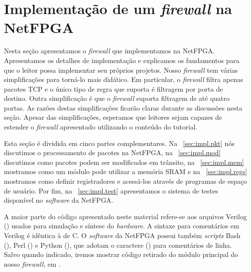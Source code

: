 \newpage
\section{Implementação de um \emph{firewall} na NetFPGA}
\label{sec:impl}

Nesta seção apresentamos o \emph{firewall} que implementamos na
NetFPGA.  Apresentamos os detalhes de implementação e explicamos os
fundamentos para que o leitor possa implementar seu próprios
projetos.  Nosso \emph{firewall} tem várias simplificações para
torná-lo mais didático.  Em particular, o \emph{firewall} filtra
apenas pacotes TCP e o único tipo de regra que suporta é filtragem
por porta de destino.  Outra simplificação é que o \emph{firewall}
suporta filtragem de até quatro portas.  As razões destas
simplificações ficarão claras durante as discussões nesta seção.
Apesar das simplificações, esperamos que leitores sejam capazes de
estender o \emph{firewall} apresentado utilizando o conteúdo do
tutorial.

Esta seção é dividida em cinco partes complementares.  Na
\secstr~\ref{sec:impl.pkt} nós discutimos o processamento de pacotes
na NetFPGA, na \secstr~\ref{sec:impl.mod} discutimos como pacotes
podem ser modificados em trânsito, na \secstr~\ref{sec:impl.mem}
mostramos como um módulo pode utilizar a memória SRAM e na
\secstr~\ref{sec:impl.regs} mostramos como definir registradores e
acessá-los através de programas de espaço de usuário.  Por fim, na
\secstr~\ref{sec:impl.test} apresentamos o sistema de testes
disponível no \emph{software} da NetFPGA.

A maior parte do código apresentado neste material refere-se aos
arquivos Verilog () usados para simulação e síntese do
\emph{hardware}.  A sintaxe para comentários em Verilog é idêntica à
de C.\footnotemark{}  O \emph{software} da NetFPGA possui também
\emph{scripts} Bash (), Perl () e Python
(), que adotam o caractere (\ssf{\#}) para comentários de
linha.  Salvo quando indicado, iremos mostrar código retirado do
módulo principal do nosso \emph{firewall}, em
.












